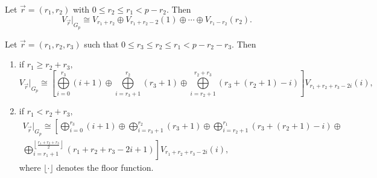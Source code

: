\documentclass[10pt,a4paper]{amsart}
\def\Gp{{G_p}}
\begin{document}
	\begin{theorem}\label{T2}
		Let $\vec{r}=(r_1,r_2)$ with $0\leq r_2\leq r_1< p-r_2.$ Then $${V_{\vec{r}}|}_{\Gp}\cong V_{r_1+r_2}\oplus V_{r_1+r_2-2}(1)\oplus \cdots\oplus V_{r_1-r_2}(r_2).$$
	\end{theorem}

	\begin{theorem}\label{T3}
		Let $\vec{r}=(r_1,r_2,r_3)$ such that $ 0\leq r_3\leq r_2\leq r_1< p-r_2-r_3.$ Then
		\begin{enumerate}
			\item if $r_1\geq r_2+r_3,$
			\begin{equation*}
			    {V_{\vec{r}}|}_{\Gp}\cong            	\displaystyle{\left[\bigoplus\limits_{i=0}^{r_3}(i+1)\oplus\bigoplus\limits_{i=r_3+1}^{r_2}(r_3+1)\oplus \bigoplus\limits_{i=r_2+1}^{r_2+r_3}(r_3+(r_2+1)-i)\right]V_{r_1+r_2+r_3-2i}(i),}
			\end{equation*}				
			
			\item if $r_1< r_2+r_3,$
			\begin{multline*}
			    {V_{\vec{r}}|}_{\Gp}\cong 
				\left[\displaystyle{\bigoplus\limits_{i=0}^{r_3}(i+1)\oplus\bigoplus\limits_{i=r_3+1}^{r_2}(r_3+1)\oplus\bigoplus\limits_{i=r_2+1}^{r_1}(r_3+(r_2+1)-i)\oplus}\right.\\
\left.\displaystyle{\bigoplus\limits_{i=r_1+1}^{\left\lfloor\frac{r_1+r_2+r_3}{2}\right\rfloor}(r_1+r_2+r_3-2i+1)}\right] V_{r_1+r_2+r_3-2i}(i),
			\end{multline*}
where $\lfloor \cdot\rfloor$ denotes the floor function.
			
		\end{enumerate}
	\end{theorem}
\end{document}

